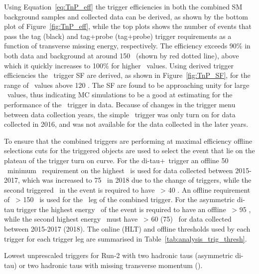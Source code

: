 	 Using Equation~\ref{eq:TnP_eff} the trigger efficiencies in both the combined \ac{SM} background samples and collected data can be derived, as shown by the bottom plot of Figure~\ref{fig:TnP_eff}, while the top plots shows the number of events that pass the tag (black) and tag+probe (tag+probe) trigger requirements as a function of transverse missing energy, respectively.
	 The efficiency exceeds 90\% in both data and background at around 150 \gev\ (shown by red dotted line), above which it quickly increases to 100\% for higher \met\ values. 
	 \metTrigEff
	 Using derived trigger efficiencies the \met\ trigger \ac{SF} are derived, as shown in Figure~\ref{fig:TnP_SF}, for the range of \met\ values above 120 \gev.
	 The \ac{SF} are found to be approaching unity for large \met\ values, thus indicating \ac{MC} simulations to be a good at estimating for the performance of the \met\ trigger in data. Because of changes in the trigger menu between data collection years, the simple \met\ trigger was only turn on for data collected in 2016, and was not available for the data collected in the later years.
	 \metTrigSF
	 
	To ensure that the combined triggers are performing at maximal efficiency offline selections cuts for the triggered objects are used to select the event that lie on the plateau of the trigger turn on curve.
	 For the di-tau+\met\ trigger an offline  50 \gev\ minimum \pt\ requirement on the highest \ltau\ is used for data collected between 2015-2017, which was increased to 75 \gev\ in 2018 due to the change of triggers, while the second triggered \ltau\ in the event is required to have \pt\ > 40 \gev. An offline requirement of \met\ > 150 \gev\ is used for the \met\ leg of the combined trigger. 
	 For the asymmetric di-tau trigger the highest energy \ltau\ of the event is required to have an offline \pt\ > 95 \gev, while the second highest energy \ltau\ must have \pt\ > 60 (75) \gev\ for data collected between 2015-2017 (2018). 
	 The online (\ac{HLT}) and offline thresholds used by each trigger for each trigger leg are summarised in Table~\ref{tab:analysis_trig_thresh}.
	 
	 \begin{table}[!hbt]
	 \centering
	\caption{Lowest unprescaled triggers for Run-2 with two hadronic taus (asymmetric di-tau) or two hadronic taus with missing transverse momentum (\met).}
		
	\label{tab:analysis_trig_thresh}
	\end{table}
	 

